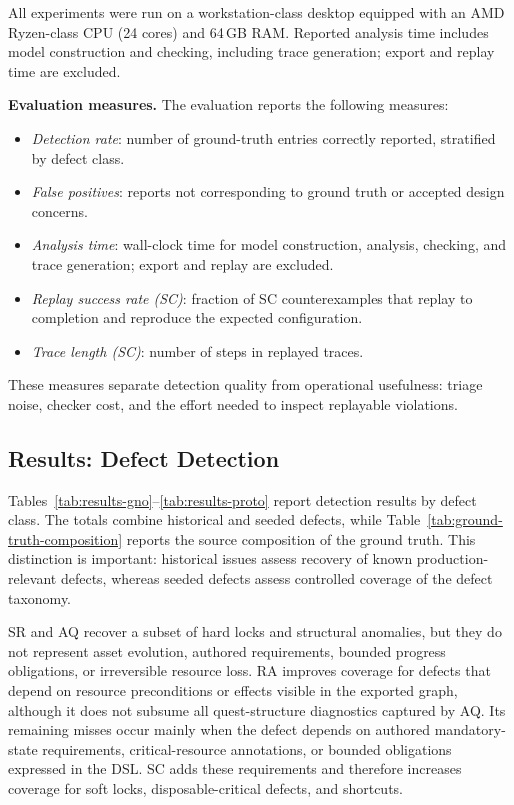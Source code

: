 \documentclass[conference]{IEEEtran}
\begin{document}
All experiments were run on a workstation-class desktop equipped with an
AMD Ryzen-class CPU (24 cores) and 64\,GB RAM. Reported
analysis time includes model construction and checking, including trace
generation; export and replay time are excluded.

\noindent\textbf{Evaluation measures.}
The evaluation reports the following measures:

\begin{itemize}[leftmargin=1.3em]
\item \textit{Detection rate}: number of ground-truth entries correctly
        reported, stratified by defect class.
\item \textit{False positives}: reports not corresponding to
        ground truth or accepted design concerns.
  \item \textit{Analysis time}: wall-clock time for model construction,
        analysis, checking, and trace generation; export and replay are excluded.
  \item \textit{Replay success rate (SC)}: fraction of SC counterexamples
        that replay to completion and reproduce the expected configuration.
  \item \textit{Trace length (SC)}: number of steps in replayed traces.
\end{itemize}

These measures separate detection quality from operational usefulness:
triage noise, checker cost, and the effort needed to inspect replayable
violations.

\subsection{Results: Defect Detection}
\label{sec:results-detection}

Tables~\ref{tab:results-gno}--\ref{tab:results-proto} report detection
results by defect class. The totals combine historical and seeded
defects, while Table~\ref{tab:ground-truth-composition} reports the
source composition of the ground truth. This distinction is important:
historical issues assess recovery of known production-relevant
defects, whereas seeded defects assess controlled coverage of the defect
taxonomy.

SR and AQ recover a subset of hard locks and structural anomalies, but
they do not represent asset evolution, authored requirements, bounded
progress obligations, or irreversible resource loss. RA improves coverage for defects that depend on resource preconditions or
effects visible in the exported graph, although it does not subsume all
quest-structure diagnostics captured by AQ. Its remaining misses occur mainly when the defect depends on authored mandatory-state requirements,
critical-resource annotations, or bounded obligations expressed in the
DSL. SC adds these requirements and therefore increases coverage for soft
locks, disposable-critical defects, and shortcuts.
\end{document}
